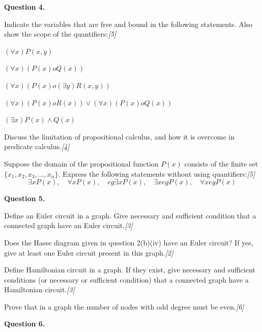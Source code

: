 \documentclass[11pt,a4paper]{article}
\newcommand{\pts}[1]{\hfill   \textit{[#1]}}
\begin{document}
\medskip


\noindent   \textbf{Question 4.}

\begin{parts}
  \item Indicate the variables that are free and bound in the following statements. Also show the scope of the quantifiers:\pts{5}
  
\begin{parts}
    \item $(\forall x)P(x, y)$
    \item $(\forall x)(P(x)  o Q(x))$
    \item $(\forall x)(P(x)  o (\exists y)R(x, y))$
    \item $(\forall x)(P(x)  o R(x)) \lor (\forall x)(P(x)  o Q(x))$
    \item $(\exists x)P(x) \land Q(x)$
  \end{parts}
  \item Discuss the limitation of propositional calculus, and how it is overcome in predicate calculus.\pts{4}
  \item Suppose the domain of the propositional function $P(x)$ consists of the finite set $\{x_1, x_2, x_3, \dots, x_n\}$. Express the following statements without using quantifiers:\pts{5}
  \[ \exists x P(x), \quad \forall x P(x), \quad 
eg\exists x P(x), \quad \exists x
eg P(x), \quad \forall x
eg P(x) \]
\end{parts}

\medskip


\noindent   \textbf{Question 5.}

\begin{parts}
  \item Define an Euler circuit in a graph. Give necessary and sufficient condition that a connected graph have an Euler circuit.\pts{3}
  \item Does the Hasse diagram given in question 2(b)(iv) have an Euler circuit? If yes, give at least one Euler circuit present in this graph.\pts{2}
  \item Define Hamiltonian circuit in a graph. If they exist, give necessary and sufficient conditions (or necessary or sufficient condition) that a connected graph have a Hamiltonian circuit.\pts{3}
  \item Prove that in a graph the number of nodes with odd degree must be even.\pts{6}
\end{parts}

\medskip


\noindent   \textbf{Question 6.}
\end{document}
